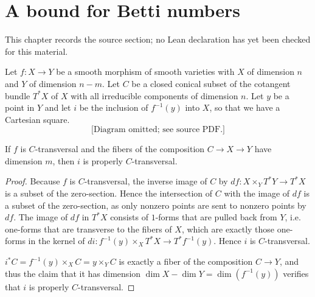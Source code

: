 \chapter{A bound for Betti numbers}
\label{bounds-stalks-perverse-sheaves-characteristic-p-shende-chapter-04}

\begin{remark}
\label{bounds-stalks-perverse-sheaves-characteristic-p-shende-chapter-04-source}
This chapter records the source section; no Lean declaration has yet been checked for this material.
\notready
\end{remark}

\begin{lemma}
\notready\label{transversality-check} Let $f: X \to Y$ be a smooth morphism of smooth varieties with $X$ of dimension $n$ and $Y$ of dimension $n-m$. Let $C$ be a closed conical subset of the cotangent bundle $T^* X$ of $X$ with all irreducible components of dimension  $n$. Let $y$ be a point in $Y$ and let $i$ be the inclusion of $f^{-1}(y)$ into $X$, so that we have a Cartesian square. \begin{equation}\label{i-diagram}\text{[Diagram omitted; see source PDF.]}\end{equation}

 If $f$ is $C$-transversal and the fibers of the composition $C \to X \to Y$ have dimension $m$, then $i$ is properly $C$-transversal. \end{lemma}

\begin{proof} Because $f$ is $C$-transversal, the inverse image of $C$ by $df: X \times_Y T^* Y \to T^* X$ is a subset of the zero-section. Hence the intersection of $C$ with the image of $df$ is a subset of the zero-section, as only nonzero points are sent to nonzero points by $df$. The image of $df$ in $T^* X$ consists of $1$-forms that are pulled back from $Y$, i.e. one-forms that are transverse to the fibers of $X$, which are exactly those one-forms in the kernel of $di: f^{-1}(y) \times_X T^* X \to T^* f^{-1}(y)$. Hence $i$ is $C$-transversal.

$i^* C = f^{-1}(y) \times_X C =  y \times_Y C$ is exactly a fiber of the composition $C \to Y$, and thus the claim that it has dimension $\dim X - \dim Y = \dim (f^{-1}(y))$ verifies that $i$ is properly $C$-transversal.

\end{proof}


